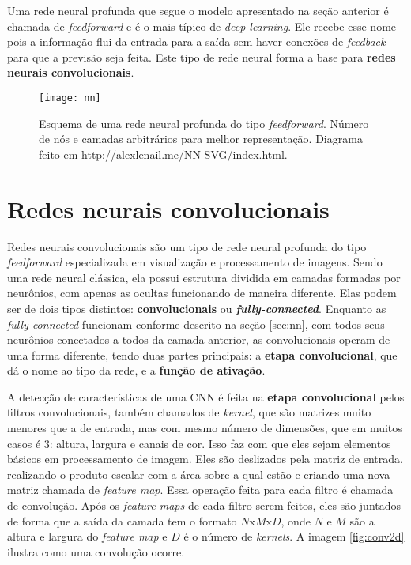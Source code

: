 Uma rede neural profunda que segue o modelo apresentado na seção anterior é chamada de \textit{feedforward} e é o mais típico de \textit{deep learning}.
Ele recebe esse nome pois a informação flui da entrada para a saída sem haver conexões de \textit{feedback} para que a previsão seja feita.
Este tipo de rede neural forma a base para \textbf{redes neurais convolucionais}.%

\begin{figure}[h!]
\texttt{[image: nn]}
\centering
\caption{Esquema de uma rede neural profunda do tipo \textit{feedforward}. Número de nós e camadas arbitrários para melhor representação. Diagrama feito em \url{http://alexlenail.me/NN-SVG/index.html}.}
\end{figure}


\section{Redes neurais convolucionais}
\label{sec:cnn}

Redes neurais convolucionais são um tipo de rede neural profunda do tipo \textit{feedforward} especializada em visualização e processamento de imagens.
Sendo uma rede neural clássica, ela possui estrutura dividida em camadas formadas por neurônios, com apenas as ocultas funcionando de maneira diferente.
Elas podem ser de dois tipos distintos:
\textbf{convolucionais} ou \textbf{\textit{fully-connected}}.
Enquanto as \textit{fully-connected} funcionam conforme descrito na seção \ref{sec:nn}, com todos seus neurônios conectados a todos da camada anterior, as convolucionais operam de uma forma diferente, tendo duas partes principais:
a \textbf{etapa convolucional}, que dá o nome ao tipo da rede,
e a \textbf{função de ativação}.

A detecção de características de uma CNN é feita na \textbf{etapa convolucional} pelos filtros convolucionais, também chamados de \textit{kernel}, que são matrizes muito menores que a de entrada, mas com mesmo número de dimensões, que em muitos casos é 3: altura, largura e canais de cor.
Isso faz com que eles sejam elementos básicos em processamento de imagem.
Eles são deslizados pela matriz de entrada, realizando o produto escalar com a área sobre a qual estão e criando uma nova matriz chamada de \textit{feature map}.
Essa operação feita para cada filtro é chamada de convolução.
Após os \textit{feature maps} de cada filtro serem feitos, eles são juntados de forma que a saída da camada tem o formato $N$x$M$x$D$, onde $N$ e $M$ são a altura e largura do \textit{feature map} e $D$ é o número de \textit{kernels}.
A imagem \ref{fig:conv2d} ilustra como uma convolução ocorre.

